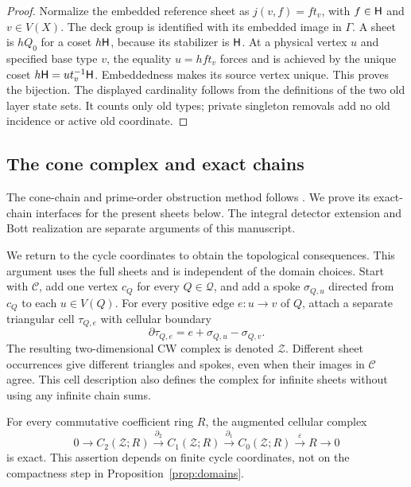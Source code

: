 \begin{proof}
Normalize the embedded reference sheet as
$j(v,f)=f t_v$, with $f\in\mathsf H$ and $v\in V(X)$.  The deck group is
identified with its embedded image in $\Gamma$.  A sheet is $hQ_0$
for a coset $h\mathsf H$, because its stabilizer is $\mathsf H$.
At a physical vertex $u$ and specified base type $v$, the equality
$u=hf t_v$ forces and is achieved by the unique coset
$h\mathsf H=u t_v^{-1}\mathsf H$.  Embeddedness makes its source vertex unique.
This proves the bijection.  The displayed cardinality follows from
the definitions of the two old layer state sets.  It counts only old
types; private singleton removals add no old incidence or active old
coordinate.
\end{proof}

\subsection{The cone complex and exact chains}

The cone-chain and prime-order obstruction method follows
\cite[Section~7.6]{OpenAIProjection}.  We prove its exact-chain
interfaces for the present sheets below.  The integral detector
extension and Bott realization are separate arguments of this manuscript.

We return to the cycle coordinates to obtain the topological consequences.
This argument uses the full sheets and is independent of the domain
choices.  Start with
$\mathcal C$, add one vertex $c_Q$ for every $Q\in\mathcal Q$, and
add a spoke $\sigma_{Q,u}$ directed from $c_Q$ to each $u\in V(Q)$.
For every positive edge $e:u\longrightarrow v$ of $Q$, attach a
separate triangular cell $\tau_{Q,e}$ with cellular boundary
\begin{equation}
 \partial\tau_{Q,e}=e+\sigma_{Q,u}-\sigma_{Q,v}.
 \label{eq:cone-boundary}
\end{equation}
The resulting two-dimensional CW complex is denoted $\mathcal Z$.
Different sheet occurrences give different triangles and spokes,
even when their images in $\mathcal C$ agree.  This cell description
also defines the complex for infinite sheets without using any
infinite chain sums.

\begin{lemma}
\label{lem:cone-exact}
For every commutative coefficient ring $R$, the augmented cellular
complex
\begin{equation}
 0\longrightarrow C_2(\mathcal Z;R)
 \xrightarrow{\partial_2} C_1(\mathcal Z;R)
 \xrightarrow{\partial_1} C_0(\mathcal Z;R)
 \xrightarrow{\varepsilon}R\longrightarrow0
 \label{eq:exact-cone-complex}
\end{equation}
is exact.  This assertion depends on finite cycle coordinates,
not on the compactness step in Proposition~\ref{prop:domains}.
\end{lemma}

